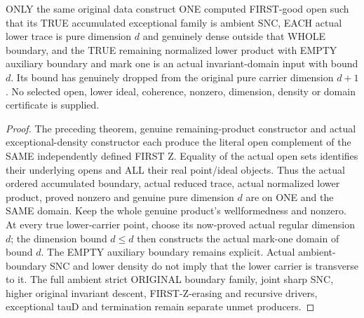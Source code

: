 \begin{theorem}
\label{hir:sharp-original-first-good-lower-dimension-domain-boundary-density}
\leanok
ONLY the same original data construct ONE computed FIRST-good open such
that its TRUE accumulated exceptional family is ambient SNC, EACH actual
lower trace is pure dimension $d$ and genuinely dense outside that WHOLE
boundary, and the TRUE remaining normalized lower product with EMPTY
auxiliary boundary and mark one is an actual invariant-domain input with
bound $d$. Its bound has genuinely dropped from the original pure carrier
dimension $d+1$. No selected open, lower ideal, coherence, nonzero,
dimension, density or domain certificate is supplied.
\end{theorem}
\begin{proof}
The preceding theorem, genuine remaining-product constructor and actual
exceptional-density constructor each produce the literal open complement
of the SAME independently defined FIRST Z. Equality of the actual open
sets identifies their underlying opens and ALL their real point/ideal
objects. Thus the actual ordered accumulated boundary, actual reduced
trace, actual normalized lower product, proved nonzero and genuine
pure dimension $d$ are on ONE and the SAME domain. Keep the whole genuine
product's wellformedness and nonzero. At every true lower-carrier point,
choose its now-proved actual regular dimension $d$; the dimension bound
$d\le d$ then constructs the actual mark-one domain of bound $d$.
The EMPTY auxiliary boundary remains explicit. Actual ambient-boundary
SNC and lower density do not imply that the lower carrier is transverse
to it. The full ambient strict ORIGINAL boundary family, joint sharp SNC,
higher original invariant descent, FIRST-Z-erasing and recursive drivers,
exceptional tauD and termination remain separate unmet producers.
\end{proof}
